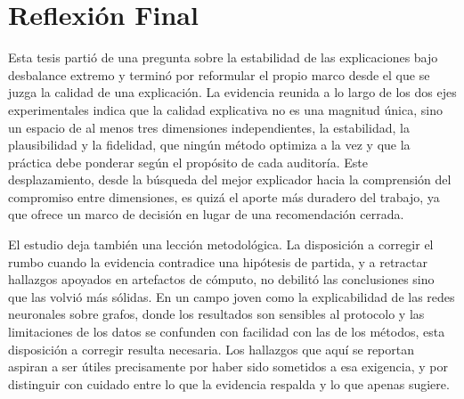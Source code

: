 \section{Reflexión Final}

Esta tesis partió de una pregunta sobre la estabilidad de las explicaciones bajo desbalance extremo y terminó por reformular el propio marco desde el que se juzga la calidad de una explicación. La evidencia reunida a lo largo de los dos ejes experimentales indica que la calidad explicativa no es una magnitud única, sino un espacio de al menos tres dimensiones independientes, la estabilidad, la plausibilidad y la fidelidad, que ningún método optimiza a la vez y que la práctica debe ponderar según el propósito de cada auditoría. Este desplazamiento, desde la búsqueda del mejor explicador hacia la comprensión del compromiso entre dimensiones, es quizá el aporte más duradero del trabajo, ya que ofrece un marco de decisión en lugar de una recomendación cerrada.

El estudio deja también una lección metodológica. La disposición a corregir el rumbo cuando la evidencia contradice una hipótesis de partida, y a retractar hallazgos apoyados en artefactos de cómputo, no debilitó las conclusiones sino que las volvió más sólidas. En un campo joven como la explicabilidad de las redes neuronales sobre grafos, donde los resultados son sensibles al protocolo y las limitaciones de los datos se confunden con facilidad con las de los métodos, esta disposición a corregir resulta necesaria. Los hallazgos que aquí se reportan aspiran a ser útiles precisamente por haber sido sometidos a esa exigencia, y por distinguir con cuidado entre lo que la evidencia respalda y lo que apenas sugiere.

